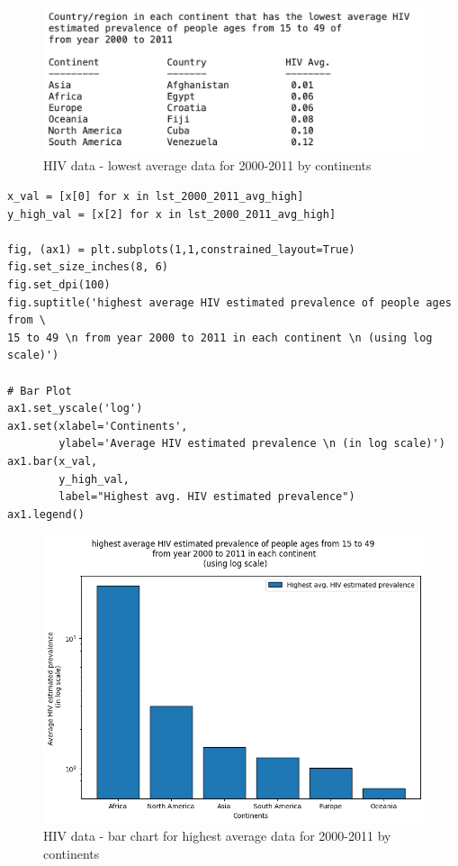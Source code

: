 \documentclass[UTF8, letter]{article}
\begin{document}
\begin{figure}[h!]
	\centering
	\includegraphics[width=\linewidth]{output_7.png}
	\caption{HIV data - lowest average data for 2000-2011 by continents}
	\label{fig:boat1}
\end{figure}

\pagebreak
\begin{codeblock}
\begin{verbatim}
x_val = [x[0] for x in lst_2000_2011_avg_high]
y_high_val = [x[2] for x in lst_2000_2011_avg_high]

fig, (ax1) = plt.subplots(1,1,constrained_layout=True)
fig.set_size_inches(8, 6)
fig.set_dpi(100)
fig.suptitle('highest average HIV estimated prevalence of people ages from \
15 to 49 \n from year 2000 to 2011 in each continent \n (using log scale)')

# Bar Plot 
ax1.set_yscale('log')
ax1.set(xlabel='Continents', 
        ylabel='Average HIV estimated prevalence \n (in log scale)')
ax1.bar(x_val, 
        y_high_val,
        label="Highest avg. HIV estimated prevalence")
ax1.legend()
\end{verbatim}
\end{codeblock}

\begin{figure}[h!]
	\centering
	\includegraphics[width=0.9\linewidth]{output_8.png}
	\caption{HIV data - bar chart for highest average data for 2000-2011 by continents}
	\label{fig:boat1}
\end{figure}
\end{document}
